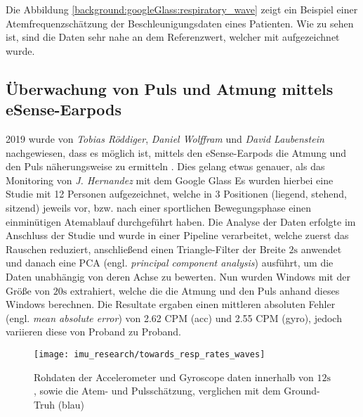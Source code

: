 Die Abbildung \ref{background:googleGlass:respiratory_wave} zeigt ein Beispiel einer Atemfrequenzschätzung der Beschleunigungsdaten eines Patienten. Wie zu sehen ist, sind die Daten sehr nahe an dem Referenzwert, welcher mit aufgezeichnet wurde.


\subsection{Überwachung von Puls und Atmung mittels eSense-Earpods}
2019 wurde von \textit{Tobias Röddiger}, \textit{Daniel Wolffram} und \textit{David Laubenstein} nachgewiesen, dass es möglich ist, mittels den eSense-Earpods die Atmung und den Puls näherungsweise zu ermitteln \cite{roddiger_towards_2019}. 
Dies gelang etwas genauer, als das Monitoring von \textit{J. Hernandez} mit dem Google Glass \cite{hernandez_cardiac_nodate}
Es wurden hierbei eine Studie mit 12 Personen aufgezeichnet, welche in 3 Positionen (liegend, stehend, sitzend) jeweils vor, bzw. nach einer sportlichen Bewegungsphase einen einminütigen Atemablauf durchgeführt haben. 
Die Analyse der Daten erfolgte im Anschluss der Studie und wurde in einer Pipeline verarbeitet, welche zuerst das Rauschen reduziert, anschließend einen Triangle-Filter der Breite $2\si{\s}$ anwendet und danach eine PCA (engl. \textit{principal component analysis}) ausführt, um die Daten unabhängig von deren Achse zu bewerten.
Nun wurden Windows mit der Größe von $20\si{\s}$ extrahiert, welche die die Atmung und den Puls anhand dieses Windows berechnen.
Die Resultate ergaben einen mittleren absoluten Fehler (engl. \textit{mean absolute error}) von 2.62 CPM (acc) und 2.55 CPM (gyro), jedoch variieren diese von Proband zu Proband.

\begin{figure}[ht]
    \texttt{[image: imu\_research/towards\_resp\_rates\_waves]}
    \caption{Rohdaten der Accelerometer und Gyroscope daten innerhalb von $12 \si{\s}$, sowie die Atem- und Pulsschätzung, verglichen mit dem Ground-Truh (blau)}
    \label{background:towards_resp_esense:results}
\end{figure}